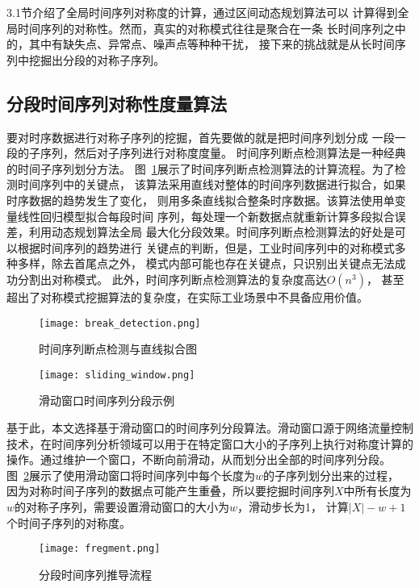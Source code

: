 3.1节介绍了全局时间序列对称度的计算，通过区间动态规划算法可以
计算得到全局时间序列的对称性。然而，真实的对称模式往往是聚合在一条
长时间序列之中的，其中有缺失点、异常点、噪声点等种种干扰，
接下来的挑战就是从长时间序列中挖掘出分段的对称子序列。

\subsection{分段时间序列对称性度量算法}
要对时序数据进行对称子序列的挖掘，首先要做的就是把时间序列划分成
一段一段的子序列，然后对子序列进行对称度度量。
时间序列断点检测算法是一种经典的时间子序列划分方法。
图~\ref{fig:break_detection}展示了时间序列断点检测算法的计算流程。为了检测时间序列中的关键点，
该算法采用直线对整体的时间序列数据进行拟合，如果时序数据的趋势发生了变化，
则用多条直线拟合整条时序数据。该算法使用单变量线性回归模型拟合每段时间
序列，每处理一个新数据点就重新计算多段拟合误差，利用动态规划算法全局
最大化分段效果。时间序列断点检测算法的好处是可以根据时间序列的趋势进行
关键点的判断，但是，工业时间序列中的对称模式多种多样，除去首尾点之外，
模式内部可能也存在关键点，只识别出关键点无法成功分割出对称模式。
此外，时间序列断点检测算法的复杂度高达$O\left(n^{3}\right)$，
甚至超出了对称模式挖掘算法的复杂度，在实际工业场景中不具备应用价值。
\begin{figure}
  \centering
  \texttt{[image: break\_detection.png]}
  \caption{时间序列断点检测与直线拟合图}
  \label{fig:break_detection}
\end{figure}
\begin{figure}
  \centering
  \texttt{[image: sliding\_window.png]}
  \caption{滑动窗口时间序列分段示例}
  \label{fig:sliding_window}
\end{figure}

基于此，本文选择基于滑动窗口的时间序列分段算法。滑动窗口源于网络流量控制
技术，在时间序列分析领域可以用于在特定窗口大小的子序列上执行对称度计算的
操作。通过维护一个窗口，不断向前滑动，从而划分出全部的时间序列分段。
图~\ref{fig:sliding_window}展示了使用滑动窗口将时间序列中每个长度为$w$的子序列划分出来的过程，
因为对称时间子序列的数据点可能产生重叠，所以要挖掘时间序列$X$中所有长度为
$w$的对称子序列，需要设置滑动窗口的大小为$w$，滑动步长为1，
计算$|X|-w+1$个时间子序列的对称度。
\begin{figure}
  \centering
  \texttt{[image: fregment.png]}
  \caption{分段时间序列推导流程}
  \label{fig:fregment}
\end{figure}


